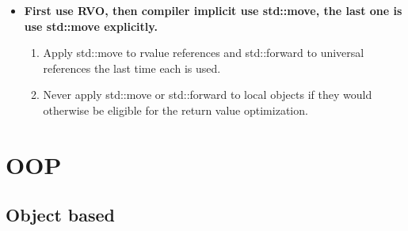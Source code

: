 \documentclass[a4paper,11pt,twoside]{book}
\begin{document}
\begin{itemize}
\item \textbf{First use RVO, then compiler implicit use std::move, the last one is use std::move explicitly.}

\begin{enumerate}
\item Apply std::move to rvalue references and std::forward to universal references
the last time each is used.

\item Never apply std::move or std::forward to local objects if they would otherwise
be eligible for the return value optimization.
\end{enumerate}


\end{itemize}


\chapter{OOP}
\section{Object based}
\end{document}
